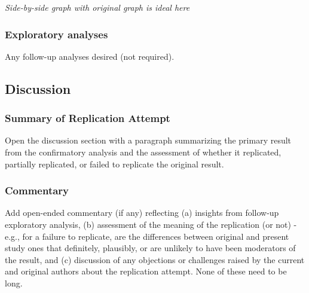 \documentclass[
  letterpaper,
  DIV=11,
  numbers=noendperiod]{scrartcl}
\begin{document}
\emph{Side-by-side graph with original graph is ideal here}

\subsubsection{Exploratory analyses}\label{exploratory-analyses}

Any follow-up analyses desired (not required).

\subsection{Discussion}\label{discussion}

\subsubsection{Summary of Replication
Attempt}\label{summary-of-replication-attempt}

Open the discussion section with a paragraph summarizing the primary
result from the confirmatory analysis and the assessment of whether it
replicated, partially replicated, or failed to replicate the original
result.

\subsubsection{Commentary}\label{commentary}

Add open-ended commentary (if any) reflecting (a) insights from
follow-up exploratory analysis, (b) assessment of the meaning of the
replication (or not) - e.g., for a failure to replicate, are the
differences between original and present study ones that definitely,
plausibly, or are unlikely to have been moderators of the result, and
(c) discussion of any objections or challenges raised by the current and
original authors about the replication attempt. None of these need to be
long.
\end{document}
